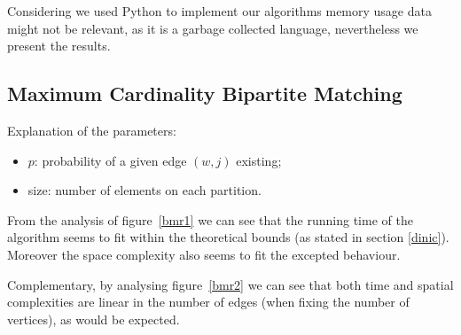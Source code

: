 \documentclass[a4,11pt]{article}
\begin{document}
Considering we used Python to implement our algorithms memory usage data might not be relevant, as it is a garbage collected language, nevertheless we present the results.

\subsection{Maximum Cardinality Bipartite Matching} \label{rmbm}
Explanation of the parameters:
\begin{itemize}
    \setlength\itemsep{-.1em}
    \item $p$: probability of a given edge $(w,j)$ existing;
    \item size: number of elements on each partition.
\end{itemize}

From the analysis of figure~\ref{bmr1} we can see that the running time of the algorithm seems to fit within the theoretical bounds (as stated in section \ref{dinic}). Moreover the space complexity also seems to fit the excepted behaviour.

Complementary, by analysing figure~\ref{bmr2} we can see that both time and spatial complexities are linear in the number of edges (when fixing the number of vertices), as would be expected.
\end{document}
